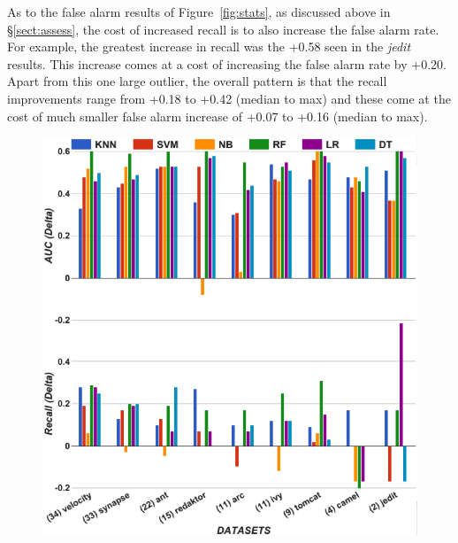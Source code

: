 \documentclass[10pt,conference]{IEEEtran}
\theoremstyle{break}
\theoremstyle{break}
\newcommand{\tion}[1]{{\S}\ref{sect:#1}}
\begin{document}
As to the false alarm results of Figure~\ref{fig:stats}, as discussed above in \tion{assess}, the cost of increased recall is to also increase
the false alarm rate. For example, the greatest increase in recall was the +0.58 seen in the {\em jedit} results. This increase comes at a cost
of increasing the false alarm rate by +0.20. Apart from this one large outlier, the overall pattern is that the recall improvements range from +0.18 to +0.42 (median to max)
and these come at the cost of much smaller false alarm increase of +0.07 to +0.16 (median to max). 




\begin{figure}[!htbp]
\begin{minipage}{.5\linewidth}
\centering
        \includegraphics[width=.95\linewidth]{./fig/AUC_auc1.png}
    \end{minipage}%
\begin{minipage}{.5\linewidth}
        \centering

\end{minipage}
\end{figure}
\end{document}
